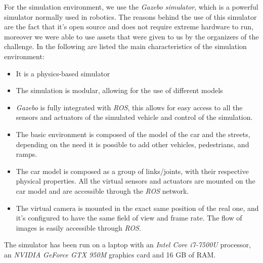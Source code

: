 \documentclass[a4paper,12pt,sort&compress]{article}
\begin{document}
    For the simulation environment, we use the \textit{Gazebo
    simulator}\citep*{1389727}, which is a powerful simulator normally used in
    robotics. The reasons behind the use of this simulator are the fact that
    it's open source and does not require extreme hardware to run, moreover we
    were able to use assets that were given to us by the organizers of the
    challenge. In the following are listed the main characteristics of the
    simulation environment:
    \begin{itemize}
        \item It is a physics-based simulator
        \item The simulation is modular, allowing for the use of different
        models 
        \item \textit{Gazebo} is fully integrated with \textit{ROS}, this allows
        for easy access to all the sensors and actuators of the simulated
        vehicle and control of the simulation.
        \item The basic environment is composed of the model of the car and the
        streets, depending on the need it is possible to add other vehicles,
        pedestrians, and ramps.
        \item The car model is composed as a group of links/joints, with their
        respective physical properties. All the virtual sensors and actuators are
        mounted on the car model and are accessible through the \textit{ROS} network.
        \item The virtual camera is mounted in the exact same position of the
        real one, and it's configured to have the same field of view and frame
        rate. The flow of images is easily accessible through \textit{ROS}.
    \end{itemize}

    The simulator has been run on a laptop with an \textit{Intel Core i7-7500U}
    processor, an \textit{NVIDIA GeForce GTX 950M} graphics card and 16 GB of
    RAM.
    
\end{document}
